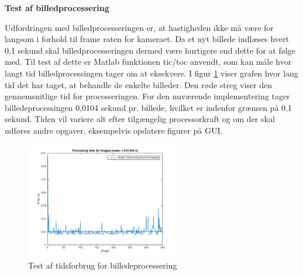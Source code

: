 \newpage
\textbf{Test af billedprocessering}

Udfordringen med billedprocesseringen er, at hastigheden ikke må være for langsom i forhold til frame raten for kameraet. Da et nyt billede indlæses hvert 0,1 sekund skal billedprocesseringen dermed være hurtigere end dette for at følge med. Til test af dette er Matlab funktionen tic/toc anvendt, som kan måle hvor langt tid billedprocessingen tager om at eksekvere. I figur \ref{fig:dataprocess} viser grafen hvor lang tid det har taget, at behandle de enkelte billeder. Den røde streg viser den gennemsnitlige tid for processeringen. For den nuværende implementering tager billedeprocessingen 0,0104 sekund pr. billede, hvilket er indenfor grænsen på 0,1 sekund. Tiden vil variere alt efter tilgængelig processorkraft og om der skal udføres andre opgaver, eksempelvis opdatere figurer på GUI. 

\begin{figure}[H]
	\centering
	\includegraphics[width=0.6\textwidth]{billeder/software/dataprocessing_2.png}
	\caption{Test af tidsforbrug for billedeprocessering}
	\label{fig:dataprocess}
\end{figure}
